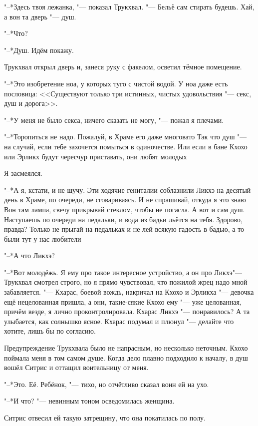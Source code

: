 "--*Здесь твоя лежанка, "--- показал Трукхвал.
"--- Бельё сам стирать будешь.
Хай, а вон та дверь "--- душ.

"--*Что?

"--*Душ.
Идём покажу.

Трукхвал открыл дверь и, занеся руку с факелом, осветил тёмное помещение.

"--*Это изобретение ноа, у которых туго с чистой водой.
У ноа даже есть пословица: <<Существуют только три истинных, чистых удовольствия "--- секс, душ и дорога>>.

"--*У меня не было секса, ничего сказать не могу, "--- пожал я плечами.

"--*Торопиться не надо.
Пожалуй, в Храме его даже многовато\ldotst
Так что душ "--- на случай, если тебе захочется помыться в одиночестве.
Или если в бане Кхохо или Эрликх будут чересчур приставать, они любят молодых\ldotst

Я засмеялся.

"--*А я, кстати, и не шучу.
Эти ходячие гениталии соблазнили Ликхэ на десятый день в Храме, по очереди, не сговариваясь.
И не спрашивай, откуда я это знаю\ldotst
Вон там лампа, свечу прикрывай стеклом, чтобы не погасла.
А вот и сам душ.
Наступаешь по очереди на педальки, и вода из бадьи льётся на тебя.
Здорово, правда?
Только не прыгай на педальках и не лей всякую гадость в бадью, а то были тут у нас любители\ldotst

"--*А что Ликхэ?

"--*Вот молодёжь.
Я ему про такое интересное устройство, а он про Ликхэ\ldotst "--- Трукхвал смотрел строго, но я прямо чувствовал, что пожилой жрец надо мной забавляется.
"--- Кхарас, боевой вождь, накричал на Кхохо и Эрликха "--- девочка ещё нецелованная пришла, а они, такие-сякие\ldotst
Кхохо ему "--- уже целованная, причём везде, я лично проконтролировала.
Кхарас Ликхэ "--- понравилось?
А та улыбается, как солнышко ясное.
Кхарас подумал и плюнул "--- делайте что хотите, лишь бы по согласию.

\razd

Предупреждение Трукхвала было не напрасным, но несколько неточным.
Кхохо поймала меня в том самом душе.
Когда дело плавно подходило к началу, в душ вошёл Ситрис и оттащил воительницу от меня.

"--*Это. Её. Ребёнок, "--- тихо, но отчётливо сказал воин ей на ухо.

"--*И что? "--- невинным тоном осведомилась женщина.

Ситрис отвесил ей такую затрещину, что она покатилась по полу.

